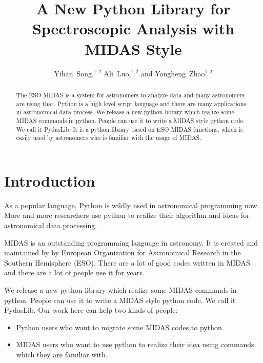 
\resetcounters

%


\title{A New Python Library for Spectroscopic Analysis with MIDAS Style}
\author{Yihan~Song,$^{1,2}$ Ali~Luo,$^{1,2}$ and Yongheng~Zhao$^{1,2}$
}


\begin{abstract}
The ESO MIDAS is a system for astronomers to analyze data and many 
astronomers are using that. Python is a high level script language and 
there are many applications in astronomical data process. 
We release a new python library which realize some MIDAS commands in python.
People can use it to write a MIDAS style python code. We call it PydasLib.
It is a python library based on ESO MIDAS functions, which is 
easily used by astronomers who is familiar with the usage of MIDAS.
\end{abstract}

	  \section{Introduction}
As a popular language, Python is wildly used in astronomical programming now. 
More and more researchers use python to realize their algorithm and ideas for 
astronomical data processing. 

MIDAS is an outstanding programming language in astronomy. It is created and 
maintained by by European Organization for Astronomical Research in the 
Southern Hemisphere (ESO). 
There are a lot of good codes written in MIDAS and there are a lot of people 
use it for years.

We release a new python library which realize some MIDAS commands in python.
People can use it to write a MIDAS style python code. We call it PydasLib.
Our work here can help two kinds of people:
\begin{itemize}
   \item Python users who want to migrate some MIDAS codes to python. 
   \item MIDAS users who want to use python to realize their idea using commands which 
they are familiar with.
\end{itemize}


